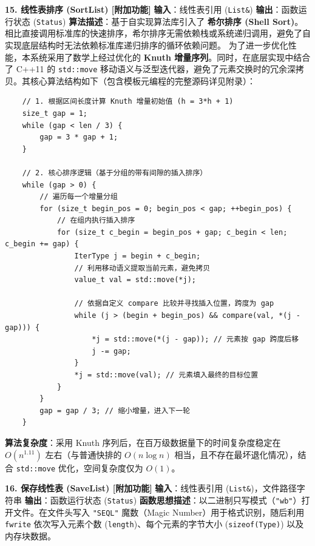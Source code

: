 \documentclass[supercite]{Experimental_Report}
\theoremstyle{definition}
\begin{document}
\vspace{0.5em}
\noindent\textbf{15. 线性表排序 (SortList) [附加功能]}
\newline\textbf{输入}：线性表引用 (\texttt{List\&})
\newline\textbf{输出}：函数运行状态 (\texttt{Status})
\newline\textbf{算法描述}：基于自实现算法库引入了 \textbf{希尔排序 (Shell Sort)}。相比直接调用标准库的快速排序，希尔排序无需依赖栈或系统递归调用，避免了自实现底层结构时无法依赖标准库递归排序的循环依赖问题。
为了进一步优化性能，本系统采用了数学上经过优化的 \textbf{Knuth 增量序列}。同时，在底层实现中结合了 C++11 的 \texttt{std::move} \cite{cppref} 移动语义与泛型迭代器，避免了元素交换时的冗余深拷贝。其核心算法结构如下（包含模板元编程的完整源码详见附录）\cite{cormen2009introduction}：

\begin{lstlisting}
	// 1. 根据区间长度计算 Knuth 增量初始值 (h = 3*h + 1)
	size_t gap = 1;
	while (gap < len / 3) {
		gap = 3 * gap + 1; 
	}
	
	// 2. 核心排序逻辑（基于分组的带有间隙的插入排序）
	while (gap > 0) {
		// 遍历每一个增量分组
		for (size_t begin_pos = 0; begin_pos < gap; ++begin_pos) {
			// 在组内执行插入排序
			for (size_t c_begin = begin_pos + gap; c_begin < len; c_begin += gap) {
				IterType j = begin + c_begin;
				// 利用移动语义提取当前元素，避免拷贝
				value_t val = std::move(*j); 
				
				// 依据自定义 compare 比较并寻找插入位置，跨度为 gap
				while (j > (begin + begin_pos) && compare(val, *(j - gap))) {
					*j = std::move(*(j - gap)); // 元素按 gap 跨度后移
					j -= gap;
				}
				*j = std::move(val); // 元素填入最终的目标位置
			}
		}
		gap = gap / 3; // 缩小增量，进入下一轮
	}
\end{lstlisting}

\noindent\textbf{算法复杂度}：采用 Knuth 序列后，在百万级数据量下的时间复杂度稳定在 $O(n^{1.11})$ 左右（与普通快排的 $O(n\log n)$ 相当，且不存在最坏退化情况），结合 \texttt{std::move} 优化，空间复杂度仅为 $O(1)$。

\vspace{0.5em}
\noindent\textbf{16. 保存线性表 (SaveList) [附加功能]}
\newline\textbf{输入}：线性表引用 (\texttt{List\&})，文件路径字符串
\newline\textbf{输出}：函数运行状态 (\texttt{Status})
\newline\textbf{函数思想描述}：以二进制只写模式（\texttt{"wb"}）打开文件。在文件头写入 \texttt{"SEQL"} 魔数（Magic Number）用于格式识别，随后利用 \texttt{fwrite} 依次写入元素个数 (\texttt{length})、每个元素的字节大小 (\texttt{sizeof(Type)}) 以及内存块数据。
\end{document}
